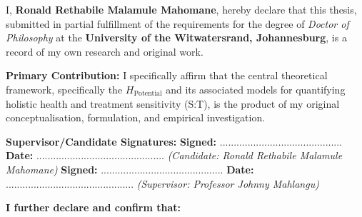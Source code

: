 \noindent I, \textbf{Ronald Rethabile Malamule Mahomane}, hereby declare that this thesis, submitted in partial fulfillment of the requirements for the degree of \textit{Doctor of Philosophy} at the \textbf{University of the Witwatersrand, Johannesburg}, is a record of my own research and original work.

\vspace{0.5cm}

\textbf{Primary Contribution:} I specifically affirm that the central theoretical framework, specifically the $H_{\text{Potential}}$ and its associated models for quantifying holistic health and treatment sensitivity (S:T), is the product of my original conceptualisation, formulation, and empirical investigation.

\vspace{0.5cm}

\textbf{Supervisor/Candidate Signatures:}
\vspace{0.5cm}
\noindent \textbf{Signed:} ............................................ \hfill \textbf{Date:} ..............................................
\noindent \textit{(Candidate: Ronald Rethabile Malamule Mahomane)}
\vspace{0.5cm}
\noindent \textbf{Signed:} ............................................ \hfill \textbf{Date:} ..............................................
\noindent \textit{(Supervisor: Professor Johnny Mahlangu)}
\vspace{0.5cm}

\noindent \textbf{I further declare and confirm that:}

